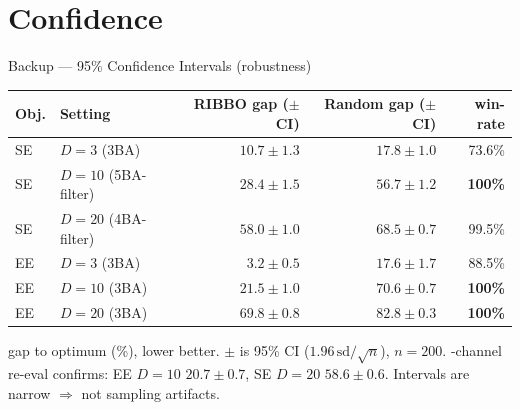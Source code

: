 \documentclass[10pt,aspectratio=169]{beamer}
\begin{document}
\section{Confidence}
\begin{frame}{Backup --- 95\% Confidence Intervals (robustness)}
    \small
    \centering
    \begin{tabular}{llrrr}
        \toprule
        Obj. & Setting & RIBBO gap ($\pm$CI) & Random gap ($\pm$CI) & win-rate \\
        \midrule
        SE & $D{=}3$ (3BA)         & $10.7 \pm 1.3$ & $17.8 \pm 1.0$ & 73.6\% \\
        SE & $D{=}10$ (5BA-filter) & $28.4 \pm 1.5$ & $56.7 \pm 1.2$ & \textbf{100\%} \\
        SE & $D{=}20$ (4BA-filter) & $58.0 \pm 1.0$ & $68.5 \pm 0.7$ & 99.5\% \\
        EE & $D{=}3$ (3BA)         & $3.2 \pm 0.5$ & $17.6 \pm 1.7$ & 88.5\% \\
        EE & $D{=}10$ (3BA)        & $21.5 \pm 1.0$ & $70.6 \pm 0.7$ & \textbf{100\%} \\
        EE & $D{=}20$ (3BA)        & $69.8 \pm 0.8$ & $82.8 \pm 0.3$ & \textbf{100\%} \\
        \bottomrule
    \end{tabular}

    \vspace{0.6em}
    {\footnotesize gap to optimum (\%), lower better. $\pm$ is 95\% CI ($1.96\,\mathrm{sd}/\sqrt{n}$), $n{=}200$. -channel re-eval confirms: EE $D{=}10$ $20.7\pm0.7$, SE $D{=}20$ $58.6\pm0.6$. \;
    Intervals are narrow $\Rightarrow$ not sampling artifacts.}
\end{frame}
\end{document}
